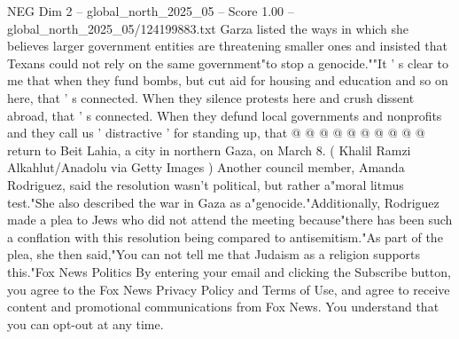 \begin{textsample}{NEG Dim 2 – global\_north\_2025\_05 – Score 1.00 – global\_north\_2025\_05/124199883.txt}
Garza listed the ways in which she believes larger government entities are threatening smaller ones and insisted that Texans could not rely on the same government"to stop a genocide.""It ' s clear to me that when they fund bombs, but cut aid for housing and education and so on here, that ' s connected.
When they silence protests here and crush dissent abroad, that ' s connected.
When they defund local governments and nonprofits and they call us ' distractive ' for standing up, that @ @ @ @ @ @ @ @ @ @ return to Beit Lahia, a city in northern Gaza, on March 8. ( Khalil Ramzi Alkahlut/Anadolu via Getty Images ) Another council member, Amanda Rodriguez, said the resolution wasn't political, but rather a"moral litmus test."She also described the war in Gaza as a"genocide."Additionally, Rodriguez made a plea to Jews who did not attend the meeting because"there has been such a conflation with this resolution being compared to antisemitism."As part of the plea, she then said,"You can not tell me that Judaism as a religion supports this."Fox News Politics By entering your email and clicking the Subscribe button, you agree to the Fox News Privacy Policy and Terms of Use, and agree to receive content and promotional communications from Fox News.
You understand that you can opt-out at any time.

\end{textsample}

